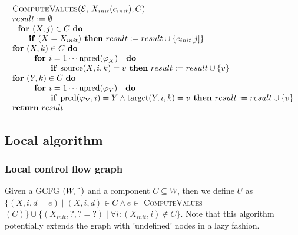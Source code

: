 \begin{equation*}
\begin{tabular}{l}
\textsc{ComputeValues(}$\mathcal{E}$, $X_{init}(e_{init}),C$\textsc{)} \\ 
$result:=$ $\emptyset $ \\ 
$\text{\textbf{for }}(X,j)\in C$ \textbf{do} \\ 
$\qquad $\textbf{if} $(X=X_{init})$\textbf{\ then} $result:=result\cup
\{e_{init}[j]\}$ \\ 
\textbf{for} $(X,k)\in C$ \textbf{do} \\ 
$\qquad \text{\textbf{for }}i=1\cdots \mathrm{npred}(\varphi _{X})\text{ 
\textbf{do}}$ \\ 
$\qquad \qquad \text{\textbf{if }}\mathrm{source}(X,i,k)=v$\textbf{\ then} $%
result:=result\cup \{v\}$ \\ 
\textbf{for} $(Y,k)\in C$ \textbf{do} \\ 
$\qquad \text{\textbf{for }}i=1\cdots \mathrm{npred}(\varphi _{Y})\text{ 
\textbf{do}}$ \\ 
$\qquad \qquad \text{\textbf{if }}\mathrm{pred}(\varphi _{Y},i)=Y\wedge 
\mathrm{target}(Y,i,k)=v$\textbf{\ then} $result:=result\cup \{v\}$ \\ 
\textbf{return} $result$%
\end{tabular}%
\end{equation*}

\newpage

\subsection{Local algorithm}

\subsubsection{Local control flow graph}

Given a GCFG $(W,\symbol{126})$ and a component $C\subseteq W$, then we
define $U$ as $\{(X,i,d=e)\mid (X,i,d)\in C\wedge e\in $ \textsc{%
ComputeValues}$(C)\}\cup \{(X_{init},?,?=?)\mid \forall i:(X_{init},i)\notin
C\}$. Note that this algorithm potentially extends the graph with
'undefined' nodes in a lazy fashion.

